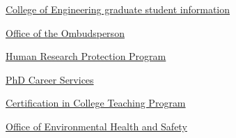 \vspace{2mm}
\noindent
\href{https://www.egr.msu.edu/academics/graduate/current-students}{College
  of Engineering graduate student information}

\vspace{2mm}
\noindent
\href{https://ombud.msu.edu/}{Office of the Ombudsperson}

\vspace{2mm}
\noindent
\href{http://hrpp.msu.edu/}{Human Research Protection Program}

\vspace{2mm}
\noindent
\href{https://grad.msu.edu/phdcareers}{PhD Career Services}

\vspace{2mm}
\noindent
\href{https://www.egr.msu.edu/academics/graduate/certification-in-college-teaching-program}{Certification
in College Teaching Program}

\vspace{2mm}
\noindent
\href{http://www.ehs.msu.edu}{Office of Environmental Health and
  Safety }
